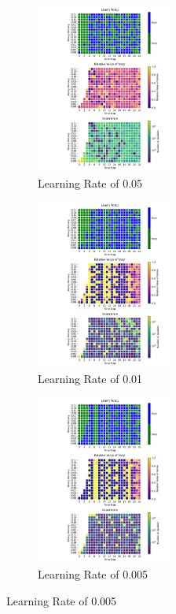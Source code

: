 \documentclass[a4paper]{article}
\begin{document}
\begin{figure}[ht]
    \centering
    \begin{subfigure}[b]{0.24\textwidth}
        \centering
        \includegraphics[width=12em]{../figures/policy_b4_lr05.pdf}
        \caption{Learning Rate of 0.05}
        \label{b4_lr05}
    \end{subfigure}
    \begin{subfigure}[b]{0.24\textwidth}
        \centering
        \includegraphics[width=12em]{../figures/policy_b4_lr01.pdf}
        \caption{Learning Rate of 0.01}
        \label{b4_lr01}
    \end{subfigure}
    \begin{subfigure}[b]{0.24\textwidth}
        \centering
        \includegraphics[width=12em]{../figures/policy_b4_lr005.pdf}
        \caption{Learning Rate of 0.005}
        \label{b4_lr005}
    \end{subfigure}

\end{figure}
\end{document}
